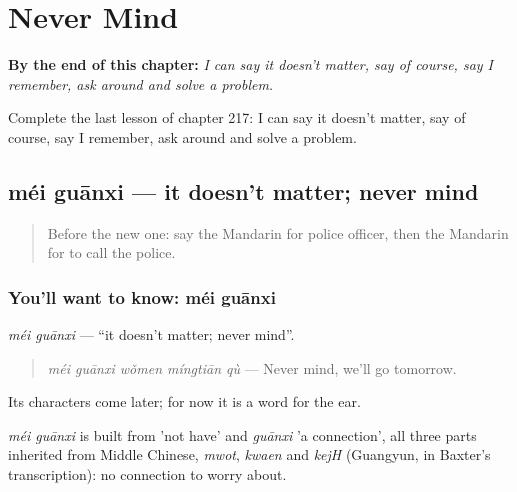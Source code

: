 
\chapter{Never Mind}
\label{ch:zh-never-mind}

\begin{chapteropening}
\textbf{By the end of this chapter:} \emph{I can say it doesn't matter, say of course, say I remember, ask around and solve a problem.}

Complete the last lesson of chapter 217: I can say it doesn't matter, say of course, say I remember, ask around and solve a problem.
\end{chapteropening}

\section[méi guānxi]{méi guānxi — it doesn't matter; never mind}

\label{lesson:ZH-C217-meiguanxi}



\begin{quote}
Before the new one: say the Mandarin for police officer, then the Mandarin for to call the police.
\end{quote}

\subsection*{You'll want to know: méi guānxi}
\emph{méi guānxi} — \textquotedblleft{}it doesn't matter; never mind\textquotedblright{}.

\begin{quote}
\emph{méi guānxi wǒmen míngtiān qù} — Never mind, we'll go tomorrow.
\end{quote}

Its characters come later; for now it is a word for the ear.

\begin{cousinweb}
\emph{méi guānxi} is built from  'not have' and \emph{guānxi} 'a connection', all three parts inherited from Middle Chinese, \emph{mwot}, \emph{kwaen} and \emph{kejH} (Guangyun, in Baxter's transcription): no connection to worry about.
\end{cousinweb}

